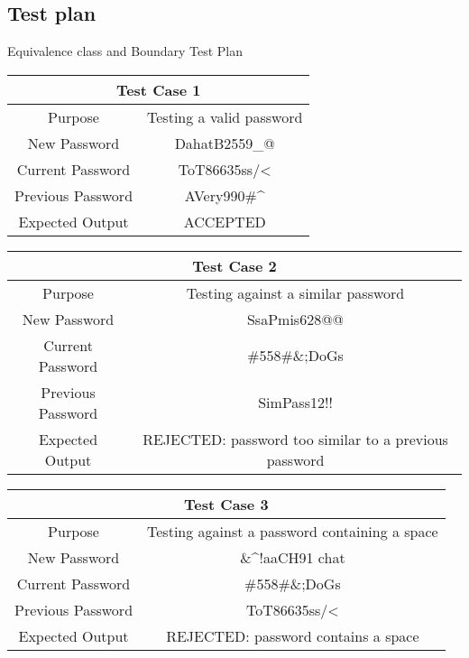 \documentclass[12pt,letterpaper]{article}
\begin{document}
\subsection{Test plan}

\newcommand{\specialcell}[2][c]{%
  \begin{tabular}[#1]{@{}c@{}}#2\end{tabular}}

\centering Equivalence class and Boundary Test Plan


\begin{center}
  \begin{tabular}{||c|c||}
  \hline
  \multicolumn{2}{||c||}{Test Case 1} \\
  \hline
  Purpose & Testing a valid password \\
  \hline
  New Password & DahatB2559\_@ \\
  \hline
  Current Password & ToT86635ss/\textless \\
  \hline
  Previous Password & AVery990\#\^{} \\
  \hline
  Expected Output & ACCEPTED \\
  \hline
  \end{tabular}
\end{center}
\vspace{1mm}
\begin{center}
  \begin{tabular}{||c|c||}
  \hline
  \multicolumn{2}{||c||}{Test Case 2} \\
  \hline
  Purpose & Testing against a similar password \\
  \hline
  New Password & SsaPmis628@@ \\
  \hline
  Current Password & \#558\#\&;DoGs \\
  \hline
  Previous Password & SimPass12!! \\
  \hline
  Expected Output & REJECTED: password too similar to a previous password \\
  \hline
  \end{tabular}
\end{center}
\vspace{1mm}
\begin{center}
  \begin{tabular}{||c|c||}
  \hline
  \multicolumn{2}{||c||}{Test Case 3} \\
  \hline
  Purpose & Testing against a password containing a space\\
  \hline
  New Password & \&\^{}!aaCH91 chat \\
  \hline
  Current Password & \#558\#\&;DoGs \\
  \hline
  Previous Password & ToT86635ss/\textless \\
  \hline
  Expected Output & REJECTED: password contains a space \\
  \hline
  \end{tabular}
\end{center}
\end{document}
